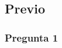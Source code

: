 \documentclass[../procedimientos.tex]{subfiles}
\begin{document}
\subsection{Previo}
\subsubsection*{Pregunta 1}
\end{document}
